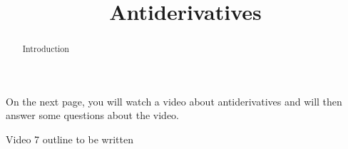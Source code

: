 \documentclass[handout]{ximera}
\title{Antiderivatives}
\begin{document}
\begin{abstract} Introduction %
\end{abstract}

\maketitle

On the next page, you will watch a video about antiderivatives and will then answer some questions about the video.

Video 7 outline to be written
\end{document}

